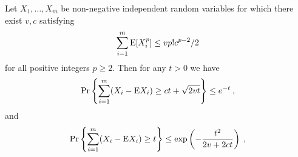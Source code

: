 \documentclass{patmorin}
\DeclareMathOperator{\exponential}{exponential}
\DeclareMathOperator{\erlang}{Erlang}
\newcommand{\abas}[1]{\textcolor{orange}{\big[Abbas: #1\big]}}
\begin{document}
\begin{thm}
\label{thm:bernstein}
Let $X_1,\dots,X_m$ be non-negative independent random variables for which there exist $v,c$ satisfying
\[\sum_{i=1}^m \mathrm{E} [X_i^p] \leq v p!  c^{p-2}/2\]
for all positive integers $p\geq2$.
Then for any $t>0$ we have
\[
\Pr \left\{ \sum_{i=1}^m (X_i - \mathrm{E} X_i) \geq ct + \sqrt{2vt}\right\}\leq e^{-t} \:,
\]
and
\[
\Pr \left\{ \sum_{i=1}^m (X_i - \mathrm{E} X_i) \geq t
\right\}\leq \exp\left(-\frac{t^2}{2v+2ct}\right) \:,
\]
\end{thm}


%
%

%
%
\end{document}

